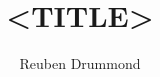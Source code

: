 \author{Reuben Drummond}
\title{<TITLE>}
\def\unitcode{<UNIT\_CODE>}
\def\unitname{<UNIT\_NAME>}
\def\studentnumber{n11040971}